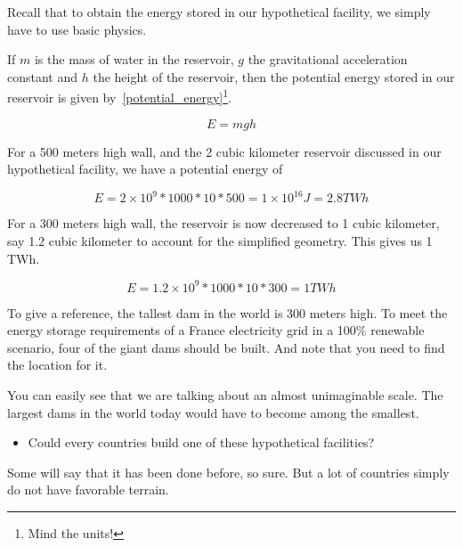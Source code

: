 \begin{remark}
Recall that to obtain the energy stored in our hypothetical facility, we simply have to use basic physics.

If $m$ is the mass of water in the reservoir, $g$ the gravitational acceleration constant and $h$ the height of the reservoir, then the potential energy stored in our reservoir is given by~\ref{potential_energy}\footnote{Mind the units!}.

\begin{equation}\label{potential_energy}
E = mgh
\end{equation}

For a 500 meters high wall, and the 2 cubic kilometer reservoir discussed in our hypothetical facility, we have a potential energy of

\begin{equation}\label{potential_energy}
E = 2 \times 10^9 * 1000 * 10 * 500 = 1 \times 10^{16} J = 2.8 TWh
\end{equation}

For a 300 meters high wall, the reservoir is now decreased to 1 cubic kilometer, say 1.2 cubic kilometer to account for the simplified geometry. This gives us 1 TWh.

\begin{equation}\label{potential_energy}
E = 1.2 \times 10^9 * 1000 * 10 * 300 = 1 TWh
\end{equation}

\end{remark}

To give a reference, the tallest dam in the world is 300 meters high. To meet the energy storage requirements of a France electricity grid in a 100\% renewable scenario, four of the giant dams should be built. And note that you need to find the location for it.

You can easily see that we are talking about an almost unimaginable scale. The largest dams in the world today would have to become among the smallest.

\begin{itemize}
\item Could every countries build one of these hypothetical facilities?
\end{itemize}

Some will say that it has been done before, so sure. But a lot of countries simply do not have favorable terrain.


